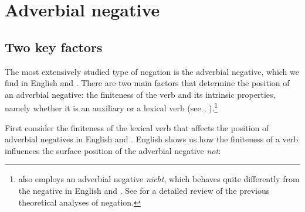 \documentclass[output=paper
	        ,collection
	        ,collectionchapter
 	        ,biblatex
                ,babelshorthands
                ,newtxmath
                ,draftmode
                ,colorlinks, citecolor=brown
]{langscibook}
\begin{document}
\section{Adverbial negative}

\subsection{Two key factors}


The most extensively studied type of negation is the adverbial negative, which
we find in English and .
There are two main factors
that determine the position of an adverbial negative: the finiteness of
the verb and its intrinsic properties, namely whether it is an auxiliary
or a lexical  verb (see \citealt[Chapter~3]{Kim:00}, \citealt{KS:02}).\footnote{ also
employs an adverbial negative \textit{nicht}, which behaves quite
differently from the negative in English and . See \citet[Section~11.7.1]{MuellerGT-Eng1}
for a detailed review of the previous theoretical analyses of  negation.}


First consider the finiteness of the lexical verb that affects
the position of adverbial
negatives in English and .
English shows us how the finiteness of a verb influences the
surface position of the adverbial negative \textit{not}:
\end{document}
